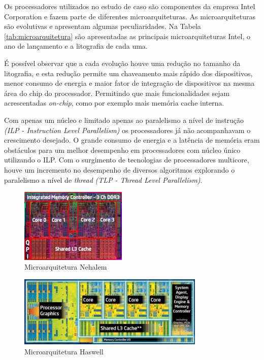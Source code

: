 \documentclass[conference]{IEEEtran}
\begin{document}
    
    
        Os processadores utilizados no estudo de caso são componentes da empresa Intel Corporation e fazem parte de diferentes microarquiteturas. As microarquiteturas são evolutivas e apresentam algumas peculiaridades. Na Tabela \ref{tab:microarquitetura} são apresentadas as principais microarquiteturas Intel, o ano de lançamento e a litografia de cada uma.
        
        É possível observar que a cada evolução houve uma redução no tamanho da litografia, e esta redução permite um chaveamento mais rápido dos dispositivos, menor consumo de energia e maior fator de integração de dispositivos na mesma área do chip do processador. Permitindo que mais funcionalidades sejam acrescentadas \textit{on-chip}, como por exemplo mais memória cache interna.
                  
        Com apenas um núcleo e limitado apenas ao paralelismo a nível de instrução \textit{(ILP - Instruction Level Parallelism)} os processadores já não acompanhavam o crescimento desejado. O grande consumo de energia e a latência de memória eram obstáculos para um melhor desempenho em processadores com núcleo único utilizando o ILP. Com o surgimento de tecnologias de processadores multicore, houve um incremento no desempenho de diversos algoritmos explorando o paralelismo a nível de \textit{thread} \textit{(TLP - Thread Level Parallelism)}.
          
        \begin{figure}[ht]
        \centering
        \includegraphics[width=2in]{nehalem-diagram}
        \caption{Microarquitetura Nehalem \cite{nehalemb}}
        \label{fig: figa}
        \end{figure}
        
        \begin{figure}[ht]
        \centering
        \includegraphics[width=3.5in]{haswell-diagram}
        \caption{Microarquitetura Haswell \cite{haswellb}}
        \label{fig: figb}
        \end{figure}
        
\end{document}
